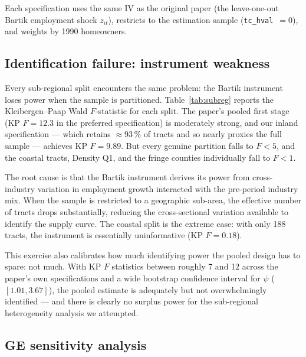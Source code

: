 \documentclass[12pt,a4paper]{article}
\begin{document}
Each specification uses the same IV as the original paper (the leave-one-out
Bartik employment shock $z_{it}$), restricts to the estimation sample
(\texttt{tc\_hval}~$= 0$), and weights by 1990 homeowners.

\subsection{Identification failure: instrument weakness}
\label{subsec:weakness}

Every sub-regional split encounters the same problem: the Bartik instrument
loses power when the sample is partitioned.  Table~\ref{tab:subreg} reports the
Kleibergen--Paap Wald $F$-statistic for each split.  The paper's pooled first
stage (KP $F = 12.3$ in the preferred specification) is moderately strong, and
our inland specification --- which retains $\approx$93\,\% of tracts and so
nearly proxies the full sample --- achieves KP $F = 9.89$.  But every genuine
partition falls to $F < 5$, and the coastal tracts, Density Q1, and the fringe
counties individually fall to $F < 1$.

The root cause is that the Bartik instrument derives its power from
cross-industry variation in employment growth interacted with the pre-period
industry mix.  When the sample is restricted to a geographic sub-area, the
effective number of tracts drops substantially, reducing the cross-sectional
variation available to identify the supply curve.  The coastal split is the
extreme case: with only 188 tracts, the instrument is essentially uninformative
(KP $F = 0.18$).

This exercise also calibrates how much identifying power the pooled design has
to spare: not much.  With KP $F$ statistics between roughly 7 and 12 across the
paper's own specifications and a wide bootstrap confidence interval for $\psi$
($[1.01, 3.67]$), the pooled estimate is adequately but not overwhelmingly
identified --- and there is clearly no surplus power for the sub-regional
heterogeneity analysis we attempted.

\subsection{GE sensitivity analysis}
\label{subsec:sensitivity}
\end{document}
